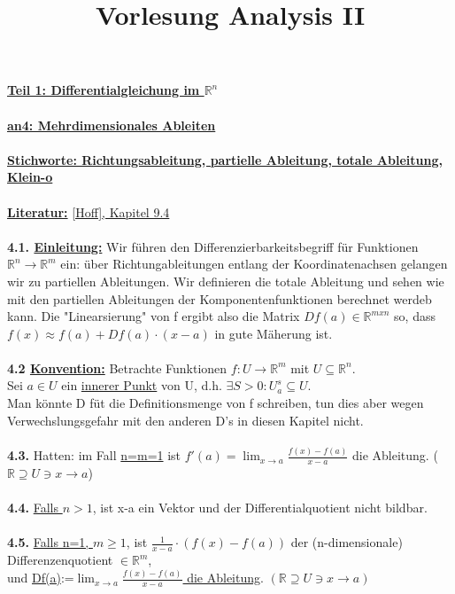 \documentclass[]{scrartcl}
\title{Vorlesung Analysis II}
\begin{document}
	\textbf{\underline{Teil 1: Differentialgleichung im $\mathbb{R}^n$}}\\
	\\
	\textbf{\underline{an4: Mehrdimensionales Ableiten}}\\
	\\
	\textbf{\underline{\underline{Stichworte:} Richtungsableitung, partielle Ableitung, totale Ableitung, Klein-o}}\\
	\\
	\textbf{\underline{Literatur:}} \ul{[Hoff], Kapitel 9.4}\\
	\\
	\textbf{4.1. \underline{Einleitung:}} Wir führen den Differenzierbarkeitsbegriff  für Funktionen $\mathbb{R}^n\rightarrow\mathbb{R}^m$ ein: über Richtungableitungen entlang der Koordinatenachsen gelangen wir zu partiellen Ableitungen. Wir definieren die totale Ableitung und sehen wie mit den partiellen Ableitungen der Komponentenfunktionen berechnet werdeb kann. Die "Linearsierung" von f ergibt also die Matrix $Df(a)\in\mathbb{R}^{m x n}$ so, dass $f(x) \approx f(a)+Df(a)\cdot(x-a)$ in gute Mäherung ist.\\
	\\
	\textbf{4.2 \underline{Konvention:}} Betrachte Funktionen $f:U\rightarrow\mathbb{R}^m$ mit $U \subseteq \mathbb{R}^n$.\\
	Sei $a \in U$ ein \ul{innerer Punkt} von U, d.h. $\exists S > 0: U_a^s\subseteq U.$\\
	Man könnte D füt die Definitionsmenge von f schreiben, tun dies aber wegen Verwechslungsgefahr mit den anderen D's in diesen Kapitel nicht.\\
	\\
	\textbf{4.3.} Hatten: im Fall \underline{n=m=1} ist $f'(a)=\lim_{x\rightarrow a}\frac{f(x)-f(a)}{x-a}$ die Ableitung.  ($\mathbb{R}\supseteq U \ni x \rightarrow a$)\\
	\\
	\textbf{4.4.} \underline{Falls $n>1$}, ist x-a ein Vektor und der Differentialquotient nicht bildbar.\\
	\\
	\textbf{4.5.} \underline{Falls n=1, $m\geq 1$}, ist $\frac{1}{x-a} \cdot (f(x)-f(a))$ der (n-dimensionale) Differenzenquotient \underline{$\in \mathbb{R}^m$},\\
	und  \ul{Df(a)}:=\ul{$\lim_{x\rightarrow a}\frac{f(x)-f(a)}{x-a}$ die Ableitung}. $(\mathbb{R}\supseteq U \ni x \rightarrow a)$\\
\end{document}
